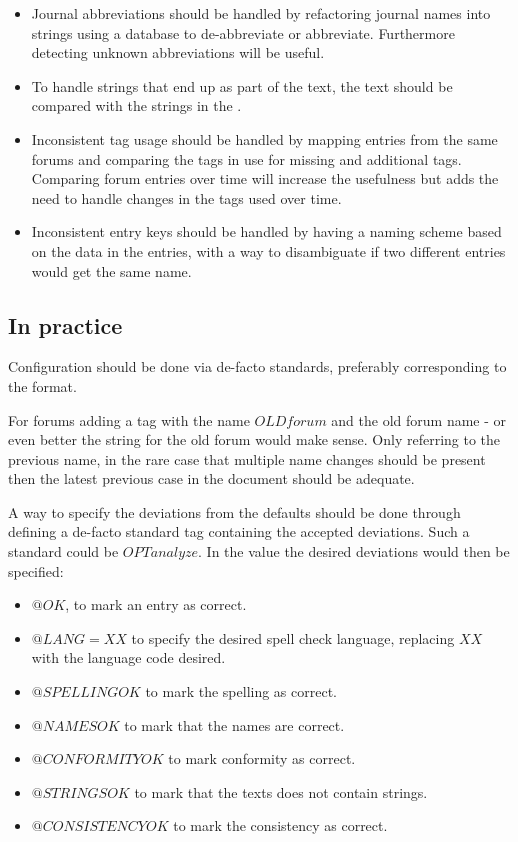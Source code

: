 \begin{itemize}
\item Journal abbreviations should be handled by refactoring journal
  names into strings using a database to de-abbreviate or abbreviate.
  Furthermore detecting unknown abbreviations will be useful.

\item To handle {\bibtex} strings that end up as part of the text, the
  text should be compared with the strings in the .

\item Inconsistent tag usage should be handled by mapping entries from
  the same forums and comparing the tags in use for missing and
  additional tags.  Comparing forum entries over time will increase
  the usefulness but adds the need to handle changes in the tags used
  over time.

\item Inconsistent entry keys should be handled by having a naming
  scheme based on the data in the entries, with a way to disambiguate
  if two different entries would get the same name.
\end{itemize}


\subsection{In practice}

Configuration should be done via de-facto standards, preferably
corresponding to the {\bibtex} format. 

For forums adding a tag with the name $OLDforum$ and the old forum
name - or even better the string for the old forum would make sense.
Only referring to the previous name, in the rare case that multiple
name changes should be present then the latest previous case in the
document should be adequate. 

A way to specify the deviations from the defaults should be done
through defining a de-facto standard tag containing the accepted
deviations.  Such a standard could be $OPTanalyze$.  In the value the
desired deviations would then be specified:

\begin{itemize}
\item $@OK$, to mark an entry as correct.
\item $@LANG=XX$ to specify the desired spell check language,
  replacing $XX$ with the language code desired.
\item $@SPELLINGOK$ to mark the spelling as correct.
\item $@NAMESOK$ to mark that the names are correct.
\item $@CONFORMITYOK$ to mark conformity as correct.
\item $@STRINGSOK$ to mark that the texts does not contain strings.
\item $@CONSISTENCYOK$ to mark the consistency as correct.
\end{itemize}

